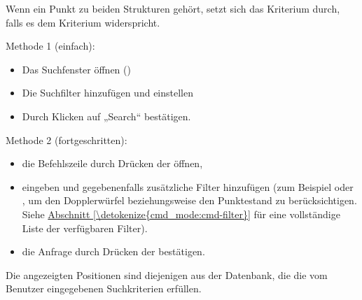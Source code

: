 \documentclass[letterpaper,10pt,german]{sphinxmanual}
\begin{document}
\sphinxAtStartPar
Wenn ein Punkt zu beiden Strukturen gehört, setzt sich das Kriterium  durch, falls es dem Kriterium  widerspricht.

\sphinxAtStartPar
Methode 1 (einfach):
\begin{itemize}
\item {} 
\sphinxAtStartPar
Das Suchfenster öffnen ()

\item {} 
\sphinxAtStartPar
Die Suchfilter hinzufügen und einstellen

\item {} 
\sphinxAtStartPar
Durch Klicken auf „Search“ bestätigen.

\end{itemize}

\sphinxAtStartPar
Methode 2 (fortgeschritten):
\begin{itemize}
\item {} 
\sphinxAtStartPar
die Befehlszeile durch Drücken der  öffnen,

\item {} 
\sphinxAtStartPar
{} eingeben und gegebenenfalls zusätzliche Filter hinzufügen (zum Beispiel  oder , um den Dopplerwürfel beziehungsweise den Punktestand zu berücksichtigen. Siehe \hyperref[\detokenize{cmd_mode:cmd-filter}]{Abschnitt \ref{\detokenize{cmd_mode:cmd-filter}}} für eine vollständige Liste der verfügbaren Filter).

\item {} 
\sphinxAtStartPar
die Anfrage durch Drücken der  bestätigen.

\end{itemize}

\sphinxAtStartPar
Die angezeigten Positionen sind diejenigen aus der Datenbank, die die vom Benutzer eingegebenen Suchkriterien erfüllen.
\end{document}
